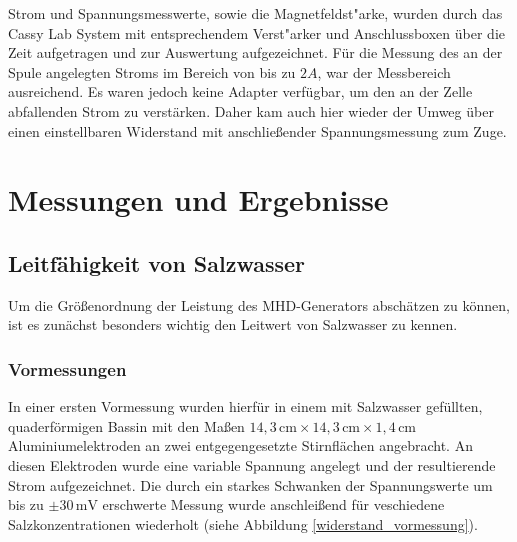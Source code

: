 \documentclass[11pt]{scrartcl}
\newcommand{\unit}[1]{\ensuremath{\,\mathrm{#1}}} %
\begin{document}
Strom und Spannungsmesswerte, sowie die Magnetfeldst"arke, wurden durch das Cassy Lab System mit entsprechendem Verst"arker und Anschlussboxen \"uber die Zeit aufgetragen und zur Auswertung aufgezeichnet. F\"ur die Messung des an der Spule angelegten Stroms im Bereich von bis zu $2A$, war der Messbereich ausreichend. Es waren jedoch keine Adapter verf\"ugbar, um den an der Zelle abfallenden Strom zu verst\"arken. Daher kam auch hier wieder der Umweg \"uber einen einstellbaren Widerstand mit anschließender Spannungsmessung zum Zuge.





\section{Messungen und Ergebnisse}

\subsection{Leitfähigkeit von Salzwasser}\label{leit}		%
Um die Größenordnung der Leistung des MHD-Generators abschätzen zu können, ist es zunächst besonders wichtig den Leitwert von Salzwasser zu kennen.

\subsubsection{Vormessungen}
In einer ersten Vormessung wurden hierfür in einem mit Salzwasser gefüllten, quaderförmigen Bassin mit den Maßen $14,3 \unit{cm} \times 14,3 \unit{cm} \times 1,4 \unit{cm}$ Aluminiumelektroden an zwei entgegengesetzte Stirnflächen angebracht.
An diesen Elektroden wurde eine variable Spannung angelegt und der resultierende Strom aufgezeichnet. Die durch ein starkes Schwanken der Spannungswerte um bis zu $\pm 30 \unit{mV}$ erschwerte Messung wurde anschleißend für veschiedene Salzkonzentrationen wiederholt (siehe Abbildung \ref{widerstand_vormessung}).
\end{document}
